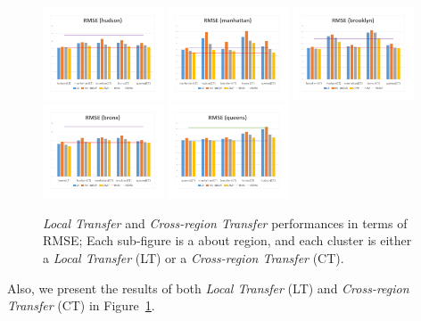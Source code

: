 \begin{figure}[th!]
	\centering
	\includegraphics[width=0.32\textwidth]{figures/1.pdf}
	\includegraphics[width=0.32\textwidth]{figures/2.pdf}
	\includegraphics[width=0.32\textwidth]{figures/3.pdf}
	\includegraphics[width=0.32\textwidth]{figures/4.pdf}
	\includegraphics[width=0.32\textwidth]{figures/5.pdf}
	\caption{\textit{Local Transfer} and \textit{Cross-region Transfer} performances in terms of RMSE; Each sub-figure is a about region, and each cluster is either a \textit{Local Transfer} (LT) or a \textit{Cross-region Transfer} (CT).}
	\label{fig:transfer}
\end{figure}
Also, we present the results of both \textit{Local Transfer} (LT) and \textit{Cross-region Transfer} (CT) in Figure~\ref{fig:transfer}.
